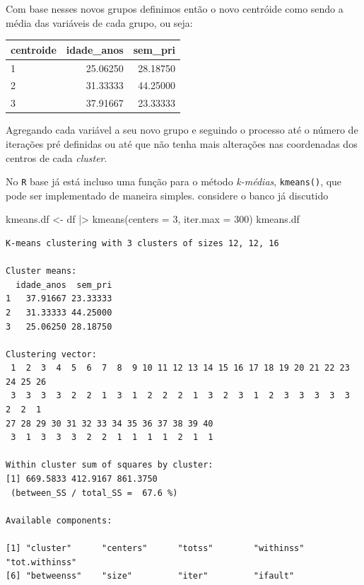 \documentclass[
  letterpaper,
  DIV=11,
  numbers=noendperiod]{scrreprt}
\newenvironment{Shaded}{\begin{snugshade}}{\end{snugshade}}
\newcommand{\AttributeTok}[1]{\textcolor[rgb]{0.40,0.45,0.13}{#1}}
\newcommand{\DecValTok}[1]{\textcolor[rgb]{0.68,0.00,0.00}{#1}}
\newcommand{\FunctionTok}[1]{\textcolor[rgb]{0.28,0.35,0.67}{#1}}
\newcommand{\NormalTok}[1]{\textcolor[rgb]{0.00,0.23,0.31}{#1}}
\newcommand{\OtherTok}[1]{\textcolor[rgb]{0.00,0.23,0.31}{#1}}
\newcommand{\SpecialCharTok}[1]{\textcolor[rgb]{0.37,0.37,0.37}{#1}}
\begin{document}
Com base nesses novos grupos definimos então o novo centróide como sendo
a média das variáveis de cada grupo, ou seja:

\begin{longtable}[]{@{}lrr@{}}
\toprule()
centroide & idade\_anos & sem\_pri \\
\midrule()
\endhead
1 & 25.06250 & 28.18750 \\
2 & 31.33333 & 44.25000 \\
3 & 37.91667 & 23.33333 \\
\bottomrule()
\end{longtable}

Agregando cada variável a seu novo grupo e seguindo o processo até o
número de iterações pré definidas ou até que não tenha mais alterações
nas coordenadas dos centros de cada \emph{cluster}.

No \texttt{R} base já está incluso uma função para o método
\emph{k-médias}, \texttt{kmeans()}, que pode ser implementado de maneira
simples. considere o banco já discutido

\begin{Shaded}
\begin{Highlighting}[]
\NormalTok{kmeans.df }\OtherTok{\textless{}{-}}\NormalTok{ df }\SpecialCharTok{|\textgreater{}}
  \FunctionTok{kmeans}\NormalTok{(}\AttributeTok{centers =} \DecValTok{3}\NormalTok{, }\AttributeTok{iter.max =} \DecValTok{300}\NormalTok{)}
\NormalTok{kmeans.df}
\end{Highlighting}
\end{Shaded}

\begin{verbatim}
K-means clustering with 3 clusters of sizes 12, 12, 16

Cluster means:
  idade_anos  sem_pri
1   37.91667 23.33333
2   31.33333 44.25000
3   25.06250 28.18750

Clustering vector:
 1  2  3  4  5  6  7  8  9 10 11 12 13 14 15 16 17 18 19 20 21 22 23 24 25 26 
 3  3  3  3  2  2  1  3  1  2  2  2  1  3  2  3  1  2  3  3  3  3  3  2  2  1 
27 28 29 30 31 32 33 34 35 36 37 38 39 40 
 3  1  3  3  3  2  2  1  1  1  1  2  1  1 

Within cluster sum of squares by cluster:
[1] 669.5833 412.9167 861.3750
 (between_SS / total_SS =  67.6 %)

Available components:

[1] "cluster"      "centers"      "totss"        "withinss"     "tot.withinss"
[6] "betweenss"    "size"         "iter"         "ifault"      
\end{verbatim}
\end{document}
